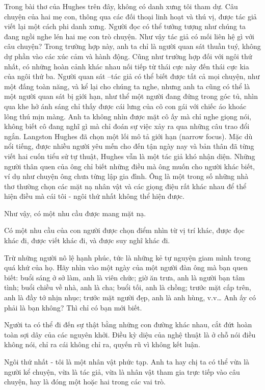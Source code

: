 \documentclass[../main.tex]{subfiles}
\begin{document}
\begin{multicols}{2}
Trong bài thơ của Hughes trên đây, không có danh xưng tôi tham dự. Câu chuyện của hai mẹ con, thông qua các đối thoại linh hoạt và thú vị, được tác giả viết lại một cách phi danh xưng. Người đọc có thể tưởng tượng như chúng ta đang ngồi nghe lén hai mẹ con trò chuyện. Như vậy tác giả có mối liên hệ gì với câu chuyện? Trong trường hợp này, anh ta chỉ là người quan sát thuần tuý, không dự phần vào các xúc cảm và hành động. Cũng như trường hợp đối với ngôi thứ nhất, có những hoàn cảnh khác nhau nối tiếp từ thái cực này đến thái cực kia của ngôi thứ ba. Người quan sát –tác giả có thể biết được tất cả mọi chuyện, như một đấng toàn năng, và kể lại cho chúng ta nghe, nhưng anh ta cũng có thể là một người quan sát bị giới hạn, như thể một người đang đứng trong góc tủ, nhìn qua khe hở ánh sáng chỉ thấy được cái lưng của cô con gái với chiếc áo khoác lông thú mịn màng. Anh ta không nhìn được mặt cô ấy mà chỉ nghe giọng nói, không biết cô đang nghĩ gì mà chỉ đoán sự việc xảy ra qua những câu trao đổi ngắn. Langston Hughes đã chọn một lối mô tả giới hạn (narrow focus). Mặc dù nổi tiếng, được nhiều người yêu mến cho đến tận ngày nay và bản thân đã từng viết hai cuốn tiểu sử tự thuật, Hughes vẫn là một tác giả khó nhận diện. Những người thân quen của ông chỉ biết những điều mà ông muốn cho người khác biết, ví dụ như chuyện ông chưa từng lập gia đình. Ông là một trong số những nhà thơ thường chọn các mặt nạ nhân vật và các giọng điệu rất khác nhau để thể hiện điều mà cái tôi - ngôi thứ nhất không thể hiện được.  
 
Như vậy, có một nhu cầu được mang mặt nạ.  
 
Có một nhu cầu của con người được chọn điểm nhìn từ vị trí khác, được đọc khác đi, được viết khác đi, và được suy nghĩ khác đi. 
 
Trừ những người nô lệ hạnh phúc, tức là những kẻ tự nguyện giam mình trong quá khứ của họ. 
Hãy nhìn vào một ngày của một người đàn ông mà bạn quen biết: buổi sáng ở sở làm, anh là viên chức; giờ ăn trưa, anh là người bạn tâm tình; buổi chiều về nhà, anh là cha; buổi tối, anh là chồng; trước mặt cấp trên, anh là đầy tớ nhịn nhục; trước mặt người đẹp, anh là anh hùng, v.v… Anh ấy có phải là bạn không? Thì chỉ có bạn mới biết.  
 
Người ta có thể đi đến sự thật bằng những con đường khác nhau, cắt đứt hoàn toàn sợi dây của các nguyên khởi. Điều kỳ diệu của nghệ thuật là ở chỗ nói điều không nói, chỉ ra cái không chỉ ra, quyến rũ vì không kết luận. 
 
Ngôi thứ nhất - tôi là một nhân vật phức tạp. Anh ta hay chị ta có thể vừa là người kể chuyện, vừa là tác giả, vừa là nhân vật tham gia trực tiếp vào câu chuyện, hay là đóng một hoặc hai trong các vai trò.  
 

\end{multicols}
\end{document}
